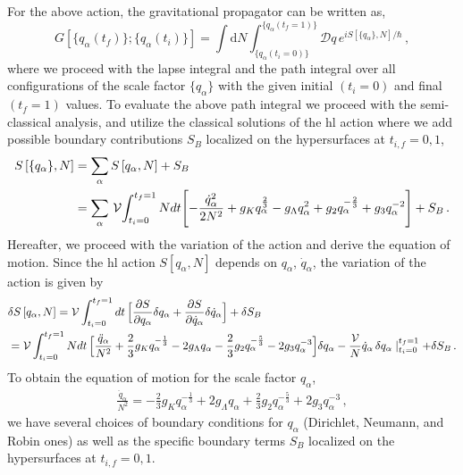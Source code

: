 \documentclass[superscriptaddress,aps,preprintnumbers,nofootinbib]{revtex4-2}
\begin{document}
For the above action, the gravitational propagator can be written as,
\begin{equation}\label{G-propagator_0}
 G\left[\{q_{\alpha}(t_f)\};\{q_{\alpha}(t_i)\}\right] = \int \mathrm{d}N
 \int_{\{q_{\alpha}(t_i=0)\}}^{\{q_{\alpha}(t_f=1)\}}
\mathcal{D}q  \, e^{i S\left[\{q_{\alpha}\},N\right] / \hbar}\,,
 \end{equation}  
where we proceed with the lapse integral and the path integral over all configurations of the scale factor  $\{q_{\alpha}\}$ with the given initial $(t_i=0)$ and final $(t_f=1)$ values. To evaluate the above path integral we proceed with the semi-classical analysis, and utilize the classical solutions of the \ac{hl} action where we add possible boundary contributions $S_B$ localized on the hypersurfaces at $t_{i,f}=0,1$,
\begin{align}
S\left[\{q_{\alpha}\},N\right]&=\sum_{\alpha}
S\left[q_{\alpha},N\right]+S_B \notag  \\
 &=\sum_{\alpha}\, {\cal V}\!\int_{t_i=0}^{t_f=1} Ndt 
 \Biggl[-\frac{\dot{q}_{\alpha}^2}{2N^2}
 +g_Kq_{\alpha}^{\frac{2}{3}}
 -g_{\Lambda}q_{\alpha}^{2} +g_{2}q_{\alpha}^{-\frac{2}{3}}+g_{3}q_{\alpha}^{-2}\Biggr]
 +S_B\,. 
\end{align}
Hereafter, we proceed with the variation of the action and derive the equation of motion. Since the \ac{hl} action $S\left[q_{\alpha},N\right]$ depends on $q_{\alpha}$, $\dot{q}_{\alpha}$, the variation of the action is given by 
\begin{align}
\begin{split}
&\delta S\left[q_{\alpha},N\right] = {\cal V}\int_{t_i=0}^{t_f=1} dt \, \Bigl[
\frac{\partial S}{\partial q_{\alpha}}\delta q_{\alpha}+\frac{\partial S}{\partial \dot{q}_{\alpha}}\delta \dot{q}_{\alpha}\Bigr]
+ \delta S_B \\
&= {\cal V}\int_{t_i=0}^{t_f=1} Ndt \, \Bigl[\frac{\ddot{q}_{\alpha}}{N^2}+\frac{2}{3}g_Kq_{\alpha}^{-\frac{1}{3}}
 -2g_{\Lambda}q_{\alpha} -\frac{2}{3}g_{2}q_{\alpha}^{-\frac{5}{3}}-2g_{3}q_{\alpha}^{-3}\Bigr] \delta q_{\alpha} -
\frac{{\cal V}}{N}\dot{q}_{\alpha}\, \delta q_{\alpha}\mid^{t_f=1}_{t_i=0} + \delta S_B\,.   \label{variation}
\end{split}
\end{align}
To obtain the equation of motion for the scale factor $q_{\alpha}$, 
\begin{align}
\frac{\ddot{q}_{\alpha}}{N^2} = -\frac{2}{3}g_Kq_{\alpha}^{-\frac{1}{3}}
 +2g_{\Lambda}q_{\alpha} +\frac{2}{3}g_{2}q_{\alpha}^{-\frac{5}{3}}+ 2g_{3}q_{\alpha}^{-3}\,, \label{eomq}
\end{align} 
we have several choices of boundary conditions for $q_{\alpha}$ (Dirichlet, Neumann, and Robin ones)  as well as the specific boundary terms $S_B$ localized on the hypersurfaces at $t_{i,f}=0,1$. 
\end{document}
